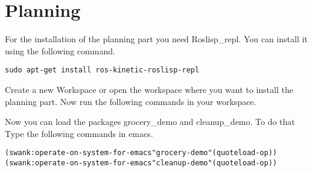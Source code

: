\documentclass[main.tex]{subfiles}
\begin{document}
	\section{Planning}
	
	For the installation of the planning part you need Roslisp\_repl.
	You can install it using the following command.
	\begin{lstlisting}
sudo apt-get install ros-kinetic-roslisp-repl 
\end{lstlisting}

	Create a new Workspace or open the workspace where you want to install the planning part. Now run the following commands in your workspace.\\
\begin{mdframed}[backgroundcolor=mygray, rightline=false]

\end{mdframed}
	
	Now you can load the packages grocery\_demo and cleanup\_demo.
	To do that Type the following commands in emacs.
	\begin{lstlisting}
(swank:operate-on-system-for-emacs"grocery-demo"(quoteload-op))
(swank:operate-on-system-for-emacs"cleanup-demo"(quoteload-op)) 
\end{lstlisting}
	
\end{document}
